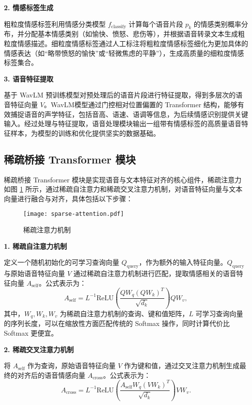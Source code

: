 \textbf{2. 情感标签生成}

粗粒度情感标签利用情感分类模型 $f_{\text{classify}}$ 计算每个语音片段 $p_k$ 的情感类别概率分布，并分配基本情感类别（如愉快、愤怒、悲伤等），并根据语音转录文本生成粗粒度情感描述。细粒度情感标签通过人工标注将粗粒度情感标签细化为更加具体的情感表达（如“略带愤怒的愉快”或“轻微焦虑的平静”），生成高质量的细粒度情感标签集合。  

\textbf{3. 语音特征提取}

基于 WavLM 预训练模型对预处理后的语音片段进行特征提取，得到多层次的语音特征向量 $V$。WavLM模型通过门控相对位置偏置的 Transformer 结构，能够有效捕捉语音的声学特征，包括音高、语速、语调等信息，为后续情感识别提供关键输入。经过处理与特征提取，语音处理模块输出一组带有情感标签的高质量语音特征样本，为模型的训练和优化提供坚实的数据基础。

\subsection{稀疏桥接 Transformer 模块}

稀疏桥接 Transformer 模块是实现语音与文本特征对齐的核心组件，稀疏注意力如图 \ref{fig:sparse-attention} 所示，通过稀疏自注意力和稀疏交叉注意力机制，对语音特征向量与文本向量进行融合与对齐，具体包括以下步骤：  

\begin{figure}[ht]
  \centering
  \texttt{[image: sparse-attention.pdf]}
  \caption{稀疏注意力机制}
  \label{fig:sparse-attention}
\end{figure}

\textbf{1. 稀疏自注意力机制}

定义一个随机初始化的可学习查询向量 $Q_{\text{query}}$，作为额外的输入特征向量。$Q_{\text{query}}$ 与原始语音特征向量 $V$ 通过稀疏自注意力机制进行匹配，提取情感相关的语音特征向量 $A_{\text{self}}$。公式表示为：
\begin{equation}
    A_{\text{self}} = L^{-1} \text{ReLU} \left( \frac{Q W_q (Q W_k)^T}{\sqrt{d_k}} \right) Q W_v,
\end{equation}
其中，$W_q, W_k, W_v$ 为稀疏自注意力机制的查询、键和值矩阵，$L$ 可学习查询向量的序列长度，可以在缩放性方面匹配传统的 Softmax 操作，同时计算代价比 Softmax 更便宜。

\textbf{2. 稀疏交叉注意力机制}

将 $A_{\text{self}}$ 作为查询，原始语音特征向量 $V$ 作为键和值，通过交叉注意力机制生成最终的对齐后的语音情感向量 $A_{\text{cross}}$。公式表示为：
\begin{equation}
    A_{\text{cross}} = L^{-1} \text{ReLU} \left( \frac{A_{\text{self}} W_q (V W_k)^T}{\sqrt{d_k}} \right) V W_v.
\end{equation}

